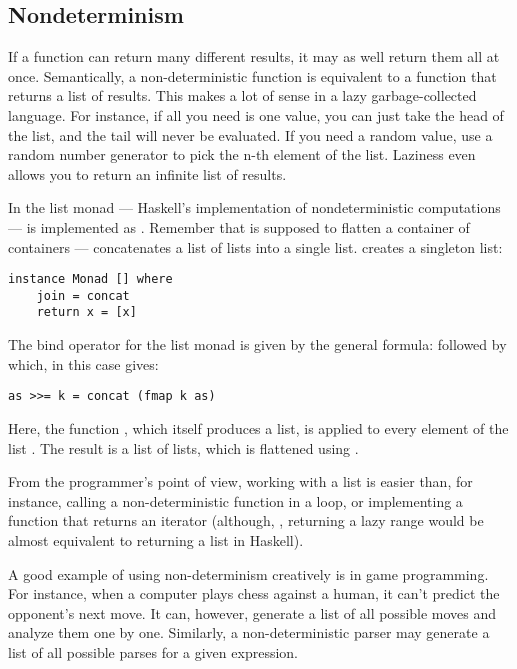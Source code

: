 \subsection{Nondeterminism}

If a function can return many different results, it may as well return
them all at once. Semantically, a non-deterministic function is
equivalent to a function that returns a list of results. This makes a
lot of sense in a lazy garbage-collected language. For instance, if all
you need is one value, you can just take the head of the list, and the
tail will never be evaluated. If you need a random value, use a random
number generator to pick the n-th element of the list. Laziness even
allows you to return an infinite list of results.

In the list monad --- Haskell's implementation of nondeterministic
computations ---  is implemented as .
Remember that  is supposed to flatten a container of
containers ---  concatenates a list of lists into a
single list.  creates a singleton list:

\begin{Verbatim}
instance Monad [] where
    join = concat
    return x = [x]
\end{Verbatim}
The bind operator for the list monad is given by the general formula:
 followed by  which, in this case gives:

\begin{Verbatim}
as >>= k = concat (fmap k as)
\end{Verbatim}
Here, the function , which itself produces a list, is applied
to every element of the list . The result is a list of lists,
which is flattened using .

From the programmer's point of view, working with a list is easier than,
for instance, calling a non-deterministic function in a loop, or
implementing a function that returns an iterator (although,
, returning a lazy range would be almost equivalent to returning a
list in Haskell).

A good example of using non-determinism creatively is in game
programming. For instance, when a computer plays chess against a human,
it can't predict the opponent's next move. It can, however, generate a
list of all possible moves and analyze them one by one. Similarly, a
non-deterministic parser may generate a list of all possible parses for
a given expression.

